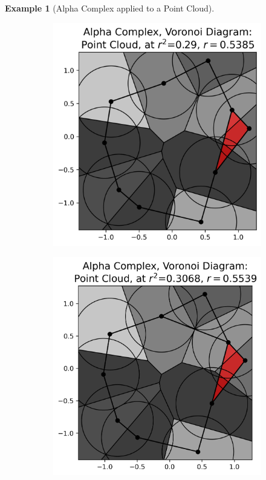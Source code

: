 \documentclass[ma]{uncgdissertationexp}
\theoremstyle{plain}
\theoremstyle{definition}
\newtheorem{example}[theorem]{Example}
\theoremstyle{remark}
\begin{document}
\begin{example}[Alpha Complex applied to a Point Cloud]
\begin{figure}[H]
\begin{subfigure}[b]{0.28\textwidth}
    \end{subfigure}
    \hfill
    \begin{subfigure}[b]{0.28\textwidth}
        \includegraphics[width=\textwidth]{point_cloud_plot_alpha_3.png}
    \end{subfigure}
    \hfill
    \begin{subfigure}[b]{0.28\textwidth}
        \includegraphics[width=\textwidth]{point_cloud_plot_alpha_4.png}

\end{subfigure}
\end{figure}
\end{example}
\end{document}
